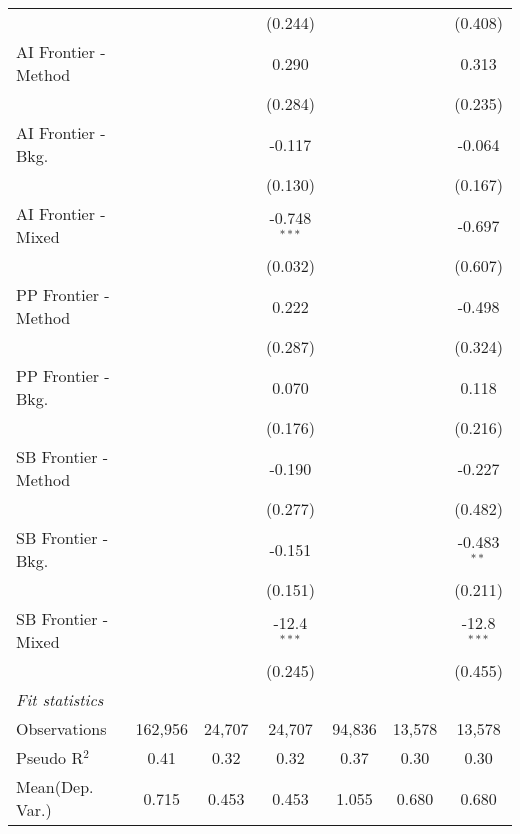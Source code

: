 \begin{tabular}{lcccccc}
                        &         &               & (0.244)        &         &               & (0.408)\\   
   AI Frontier - Method &         &               & 0.290          &         &               & 0.313\\   
                        &         &               & (0.284)        &         &               & (0.235)\\   
   AI Frontier - Bkg.   &         &               & -0.117         &         &               & -0.064\\   
                        &         &               & (0.130)        &         &               & (0.167)\\   
   AI Frontier - Mixed  &         &               & -0.748$^{***}$ &         &               & -0.697\\   
                        &         &               & (0.032)        &         &               & (0.607)\\   
   PP Frontier - Method &         &               & 0.222          &         &               & -0.498\\   
                        &         &               & (0.287)        &         &               & (0.324)\\   
   PP Frontier - Bkg.   &         &               & 0.070          &         &               & 0.118\\   
                        &         &               & (0.176)        &         &               & (0.216)\\   
   SB Frontier - Method &         &               & -0.190         &         &               & -0.227\\   
                        &         &               & (0.277)        &         &               & (0.482)\\   
   SB Frontier - Bkg.   &         &               & -0.151         &         &               & -0.483$^{**}$\\   
                        &         &               & (0.151)        &         &               & (0.211)\\   
   SB Frontier - Mixed  &         &               & -12.4$^{***}$  &         &               & -12.8$^{***}$\\   
                        &         &               & (0.245)        &         &               & (0.455)\\   
   \midrule
   \emph{Fit statistics}\\
   Observations         & 162,956 & 24,707        & 24,707         & 94,836  & 13,578        & 13,578\\  
   Pseudo R$^2$         & 0.41    & 0.32          & 0.32           & 0.37    & 0.30          & 0.30\\  
Mean(Dep. Var.) & 0.715 & 0.453 & 0.453 & 1.055 & 0.680 & 0.680 \\
   

\end{tabular}
